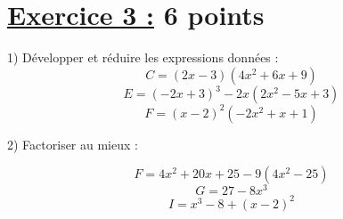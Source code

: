 \documentclass[12pt,a4paper]{article}
\begin{document}
\section*{\underline{Exercice 3 :} 6 points}
1) Développer et réduire les expressions données :
\[
C = (2x - 3)(4x^2 + 6x + 9)
\]
\[
E = (-2x + 3)^3 - 2x(2x^2 - 5x + 3)
\]
\[
F = (x - 2)^2(-2x^2 + x + 1)
\]

2) Factoriser au mieux :

\[
F = 4x^2 + 20x + 25 - 9(4x^2 - 25)
\]
\[
G = 27 - 8x^3
\]
\[
I = x^3 - 8 + (x - 2)^2
\]
\end{document}
